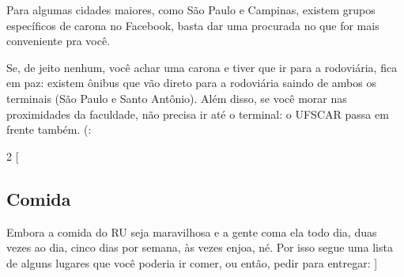 Para algumas cidades maiores, como São Paulo e Campinas, existem grupos específicos de carona no Facebook, basta dar uma procurada no que for mais conveniente pra você.

Se, de jeito nenhum, você achar uma carona e tiver que ir para a rodoviária, fica em paz: existem ônibus que vão direto para a rodoviária saindo de ambos os terminais (São Paulo e Santo Antônio). Além disso, se você morar nas proximidades da faculdade, não precisa ir até o terminal: o UFSCAR passa em frente também. (:

\begin{multicols}{2}
  [
  \subsection{Comida}
  Embora a comida do RU seja maravilhosa e a gente coma ela todo dia, duas vezes ao dia, cinco dias por semana, às vezes enjoa, né. Por isso segue uma lista de alguns lugares que você poderia ir comer, ou então, pedir para entregar:
  ]


\end{multicols}
